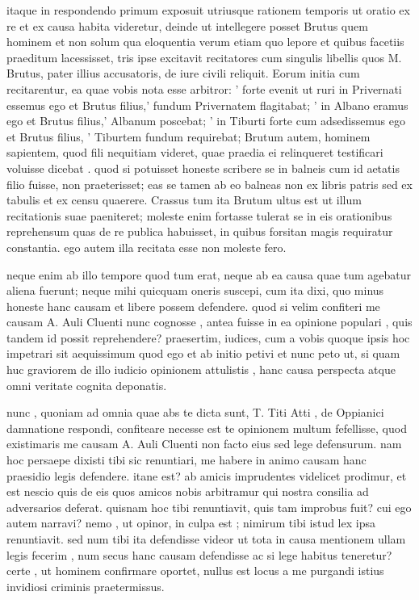  itaque in respondendo primum exposuit utriusque rationem temporis ut oratio ex re et ex causa habita videretur, deinde ut intellegere posset Brutus quem hominem et non solum qua eloquentia verum etiam quo lepore et quibus facetiis praeditum lacessisset, tris ipse excitavit recitatores cum singulis libellis quos M. Brutus, pater illius accusatoris, de iure civili reliquit. Eorum initia cum recitarentur, ea quae vobis nota esse arbitror: ' forte evenit ut ruri in Privernati essemus ego et Brutus filius,' fundum Privernatem flagitabat; ' in Albano eramus ego et Brutus filius,' Albanum poscebat; ' in Tiburti forte cum adsedissemus ego et Brutus filius, ' Tiburtem fundum requirebat; Brutum autem, hominem sapientem, quod fili nequitiam videret, quae praedia ei relinqueret testificari voluisse dicebat . quod si potuisset honeste scribere se in balneis cum id aetatis filio fuisse, non praeterisset; eas se tamen ab eo balneas non ex libris patris sed ex tabulis et ex censu quaerere. Crassus tum ita Brutum ultus est ut illum recitationis suae paeniteret; moleste enim fortasse tulerat se in eis orationibus reprehensum quas de re publica habuisset, in quibus forsitan magis requiratur constantia. ego autem illa recitata esse non moleste fero.

 neque enim ab illo tempore quod tum erat, neque ab ea causa quae tum agebatur aliena fuerunt; neque mihi quicquam oneris suscepi, cum ita dixi, quo minus honeste hanc causam et libere possem defendere. quod si velim confiteri me causam A. Auli Cluenti nunc cognosse , antea fuisse in ea opinione populari , quis tandem id possit reprehendere? praesertim, iudices, cum a vobis quoque ipsis hoc impetrari sit aequissimum quod ego et ab initio petivi et nunc peto ut, si quam huc graviorem de illo iudicio opinionem attulistis , hanc causa perspecta atque omni veritate cognita deponatis.

 nunc , quoniam ad omnia quae abs te dicta sunt, T. Titi Atti , de Oppianici damnatione respondi, confiteare necesse est te opinionem multum fefellisse, quod existimaris me causam A. Auli Cluenti non facto eius sed lege defensurum. nam hoc persaepe dixisti tibi sic renuntiari, me habere in animo causam hanc praesidio legis defendere. itane est? ab amicis imprudentes videlicet prodimur, et est nescio quis de eis quos amicos nobis arbitramur qui nostra consilia ad adversarios deferat. quisnam hoc tibi renuntiavit, quis tam improbus fuit? cui ego autem narravi? nemo , ut opinor, in culpa est ; nimirum tibi istud lex ipsa renuntiavit. sed num tibi ita defendisse videor ut tota in causa mentionem ullam legis fecerim , num secus hanc causam defendisse ac si lege habitus teneretur? certe , ut hominem confirmare oportet, nullus est locus a me purgandi istius invidiosi criminis praetermissus.

